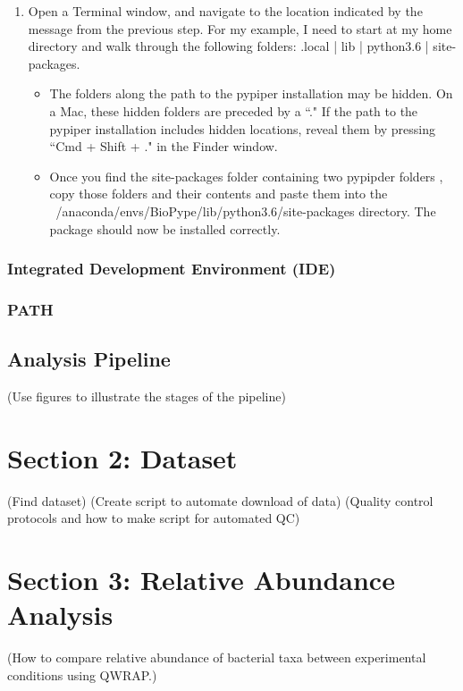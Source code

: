 \begin{enumerate}
\begin{enumerate}
            \item Open a Terminal window, and navigate to the location indicated by the message from the previous step. For my example, I need to start at my home directory and walk through the following folders: .local | lib | python3.6 | site-packages. 
            \begin{itemize}
                \item The folders along the path to the pypiper installation may be hidden. On a Mac, these hidden folders are preceded by a ``." If the path to the pypiper installation includes hidden locations, reveal them by pressing ``Cmd + Shift + ." in the Finder window.
            \item Once you find the site-packages folder containing two pypipder folders , copy those folders and their contents and paste them into the ~/anaconda/envs/BioPype/lib/python3.6/site-packages directory. The package should now be installed correctly.  
            \marginlabel{}
            \end{itemize}
        \end{enumerate}    
    \end{enumerate}

\subsection{Integrated Development Environment (IDE)}
%
\subsection{PATH}
\section{Analysis Pipeline}
(Use figures to illustrate the stages of the pipeline)

\chapter{Section 2: Dataset}
(Find dataset)
(Create script to automate download of data)
(Quality control protocols and how to make script for automated QC)

\chapter{Section 3: Relative Abundance Analysis}
(How to compare relative abundance of bacterial taxa between experimental conditions using QWRAP.)

